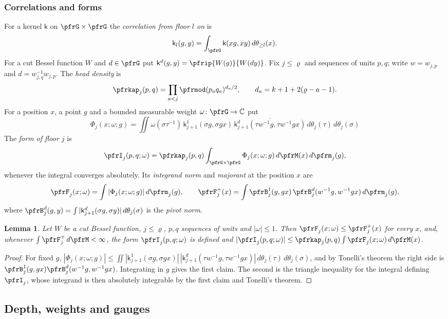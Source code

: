 \documentclass[10pt]{amsart}
\newtheorem{lemma}[theorem]{Lemma}
\theoremstyle{definition}
\theoremstyle{remark}
\newcommand{\C}{\mathbb C}
\begin{document}
\subsubsection*{Correlations and forms}
For a kernel $\mathsf k$ on $\pfrG\times\pfrG$ the \emph{correlation from floor $l$ on} is
\[
\mathsf k_l(g,y)=\int_\pfrG\mathsf k(xg,xy)\,d\theta_{\ge l}(x).
\]
For a cut Bessel function $W$ and $d\in\pfrG$ put $\mathsf k^{d}(g,y)=\pfrip{W(g)}{W(dy)}$. Fix $j\le
\varrho$ and sequences of units $p,q$; write $w=w_{j,p}$ and $d=w_{j,q}^{-1}w_{j,p}$. The
\emph{head density} is
\[
\pfrkap_j(p,q)=\prod_{a<j}\pfrmod(p_aq_a)^{d_a/2},\qquad d_a=k+1+2(\varrho-a-1).
\]
For a position $x$, a point $g$ and a bounded measurable weight $\omega\colon\pfrG\to\C$ put
\[
\Phi_j(x;\omega;g)=\iint\omega(\sigma\tau^{-1})\,\mathsf k^1_{j+1}(\sigma g,\sigma gx)\,
\overline{\mathsf k^{d}_{j+1}(\tau w^{-1}g,\tau w^{-1}gx)}\,d\theta_j(\tau)\,d\theta_j(\sigma)
\]
The
\emph{form of floor $j$} is
\[
\pfrI_j(p,q;\omega)=\pfrkap_j(p,q)\int_{\pfrG\times\pfrG}\Phi_j(x;\omega;g)\,d\pfrM(x)\,d\pfrm_j(g),
\]
whenever the integral converges absolutely. Its \emph{integrand norm} and \emph{majorant} at the
position $x$ are
\[
\pfrF_j(x;\omega)=\int|\Phi_j(x;\omega;g)|\,d\pfrm_j(g),\qquad
\pfrF_j^+(x)=\int\pfrB^1_j(g,gx)\,\pfrB^{d}_j(w^{-1}g,w^{-1}gx)\,d\pfrm_j(g),
\]
where $\pfrB^{d}_j(g,y)=\int|\mathsf k^{d}_{j+1}(\sigma g,\sigma y)|\,d\theta_j(\sigma)$ is the
\emph{pivot norm}.

\begin{lemma}\label{pfr:L1}
Let $W$ be a cut Bessel function, $j\le\varrho$, $p,q$ sequences of units and $|\omega|\le1$. Then
$\pfrF_j(x;\omega)\le\pfrF^+_j(x)$ for every $x$, and, whenever $\int\pfrF_j^+\,d\pfrM<\infty$, the
form $\pfrI_j(p,q;\omega)$ is defined and
$|\pfrI_j(p,q;\omega)|\le\pfrkap_j(p,q)\int\pfrF_j(x;\omega)\,d\pfrM(x)$.
\end{lemma}
\begin{proof}
For fixed $g$, $|\Phi_j(x;\omega;g)|\le\iint|\mathsf k^1_{j+1}(\sigma g,\sigma gx)|\,
|\mathsf k^{d}_{j+1}(\tau w^{-1}g,\tau w^{-1}gx)|\,d\theta_j(\tau)\,d\theta_j(\sigma)$, and by
Tonelli's theorem the right side is $\pfrB^1_j(g,gx)\pfrB^{d}_j(w^{-1}g,w^{-1}gx)$. Integrating in $g$
gives the first claim. The second is the triangle inequality for the integral defining $\pfrI_j$, whose
integrand is then absolutely integrable by the first claim and Tonelli's theorem.
\end{proof}

\subsection{Depth, weights and gauges}\label{pfr:ss-gauge}
\end{document}
